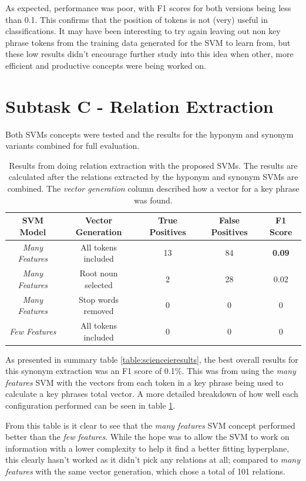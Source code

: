 As expected, performance was poor, with F1 scores for both versions being less than 0.1. This confirms that the position of tokens is not (very) useful in classifications. It may have been interesting to try again leaving out non key phrase tokens from the training data generated for the SVM to learn from, but these low results didn't encourage further study into this idea when other, more efficient and productive concepts were being worked on.

\section{Subtask C - Relation Extraction}

Both SVMs concepts were tested and the results for the hyponym and synonym variants combined for full evaluation.

\begin{table}
	\centering
	\begin{tabular}{ c | c | c | c | c }
		\textbf{SVM Model} & \textbf{Vector Generation} & \textbf{True Positives} & \textbf{False Positives} & \textbf{F1 Score} \\
		\hline
		\textit{Many Features} & All tokens included & 13 & 84 & \textbf{0.09} \\
		\textit{Many Features} & Root noun selected & 2 & 28 & 0.02 \\
		\textit{Many Features} & Stop words removed & 0 & 0 & 0 \\
		\textit{Few Features} & All tokens included & 0 & 0 & 0 \\
	\end{tabular}
	\caption[Relation Extraction Specific Results]{Results from doing relation extraction with the proposed SVMs. The results are calculated after the relations extracted by the hyponym and synonym SVMs are combined. The \textit{vector generation} column described how a vector for a key phrase was found.}
	\label{table:relresults}
\end{table}

As presented in summary table \ref{table:scienceieresults}, the best overall results for this synonym extraction was an F1 score of 0.1\%. This was from using the \textit{many features} SVM with the vectors from each token in a key phrase being used to calculate a key phrases total vector. A more detailed breakdown of how well each configuration performed can be seen in table \ref{table:relresults}. 

From this table is it clear to see that the \textit{many features} SVM concept performed better than the \textit{few features}. While the hope was to allow the SVM to work on information with a lower complexity to help it find a better fitting hyperplane, this clearly hasn't worked as it didn't pick any relations at all; compared to \textit{many features} with the same vector generation, which chose a total of 101 relations. 

